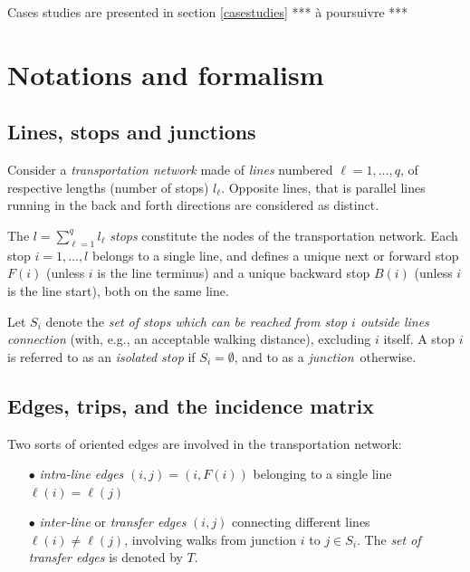 \documentclass{bmcart}
\begin{document}
Cases studies are presented in section \ref{casestudies} *** à poursuivre *** 






\section{Notations and formalism}
\label{notforma}
\subsection{Lines, stops  and junctions}
\label{Lines and junctions}
Consider a \emph{transportation network} made of \emph{lines} numbered $\ell=1,\ldots, q$, of respective lengths (number of stops) $l_\ell$.  Opposite lines, that is parallel lines running in the back and forth directions are considered as distinct. 

The $l=\sum_{\ell=1}^ql_\ell$ \emph{stops} constitute the nodes of the transportation network. Each stop $i=1,\ldots,l$ belongs to a single line, and defines a unique next or forward stop $F(i)$ (unless $i$ is the line terminus) and a unique backward stop $B(i)$ (unless $i$ is the line start), both on the same line.  

Let $S_i$ denote the \emph{set of stops which can be reached from stop $i$ outside lines connection} (with, e.g., an acceptable walking distance), excluding $i$ itself. A stop $i$ is referred to as an \emph{isolated stop} if $S_i=\emptyset$, and to as a \emph{junction} otherwise. 


\subsection{Edges, trips, and the incidence matrix}
\label{Line edges, transfer edges and trips}

Two sorts of oriented edges are involved in the transportation network: 
\begin{enumerate}
  \item[$\bullet$] \emph{intra-line edges} $(i,j)=(i,F(i))$ belonging to a single line  $\ell(i)=\ell(j)$
  \item[$\bullet$] \emph{inter-line} or \emph{transfer edges} $(i,j)$ connecting different lines $\ell(i)\neq \ell(j)$, involving walks from junction $i$ to $j\in S_i$. The \emph{set of transfer edges} is denoted by $T$.
\end{enumerate}
\end{document}
